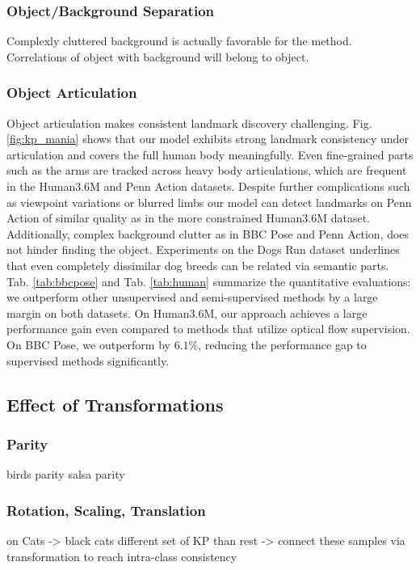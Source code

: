		\subsubsection{Object/Background Separation}
			Complexly cluttered background is actually favorable for the method. Correlations of object with background will belong to object.
		\subsubsection{Object Articulation}
			Object articulation makes consistent landmark discovery challenging.
			Fig. \ref{fig:kp_mania} shows that our model exhibits strong landmark consistency under articulation and covers the full human body meaningfully.
			Even fine-grained parts such as the arms are tracked across heavy body articulations, which are frequent in the Human3.6M and Penn Action datasets.
			Despite further complications such as viewpoint variations or blurred limbs our model can detect landmarks on Penn Action of similar quality as in the more constrained Human3.6M dataset.
			Additionally, complex background clutter as in BBC Pose and Penn Action, does not hinder finding the object.
			Experiments on the Dogs Run dataset underlines that even completely dissimilar dog breeds can be related via semantic parts.
			Tab. \ref{tab:bbcpose} and Tab. \ref{tab:human} summarize the quantitative evaluations: we outperform other unsupervised and semi-supervised methods by a large margin on both datasets.
			On Human3.6M, our approach achieves a large performance gain even compared to methods that utilize optical flow supervision.
			On BBC Pose, we outperform \cite{jakab18} by $6.1\%$, reducing the performance gap to supervised methods significantly.
	\subsection{Effect of Transformations}
		\subsubsection{Parity}
		birds parity
		salsa parity
		\subsubsection{Rotation, Scaling, Translation}
			on Cats -> black cats different set of KP than rest -> connect these samples via transformation to reach intra-class consistency
